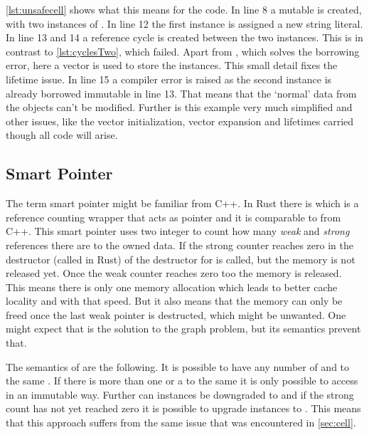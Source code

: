 \documentclass[thesis]{subfiles}
\begin{document}
    \autoref{lst:unsafecell} shows what this means for the code.
    In line 8 a mutable  is created, with two instances of \Node.
    In line 12 the first instance is assigned a new string literal.
    In line 13 and 14 a reference cycle is created between the two  instances.
    This is in contrast to \autoref{lst:cyclesTwo}, which failed.
    Apart from , which solves the borrowing error, here a vector is used to store the \Node instances.
    This small detail fixes the lifetime issue.
    In line 15 a compiler error is raised as the second \Node instance is already borrowed immutable in line 13.
    That means that the `normal' data from the objects can't be modified.
    Further is this example very much simplified and other issues, like the vector initialization, vector expansion and lifetimes carried though all code will arise.

    

  \subsection{Smart Pointer}
    The term smart pointer might be familiar from C++.
    In Rust there is \RcT which is a reference counting wrapper that acts as pointer and it is comparable to  from C++.
    This smart pointer uses two integer to count how many \emph{weak} and \emph{strong} references there are to the owned data.
    If the strong counter reaches zero in the destructor (called  in Rust) of \RcT the destructor for \T is called, but the memory is not released yet.
    Once the weak counter reaches zero too the memory is released.
    This means there is only one memory allocation which leads to better cache locality and with that speed.
    But it also means that the memory can only be freed once the last weak pointer is destructed, which might be unwanted.
    One might expect that \RcT is the solution to the graph problem, but its semantics prevent that.\autocite{rust-doc}

    The semantics of \RcT are the following.
    It is possible to have any number of \RcTs and \WeakTs to the same \T.
    If there is more than one \RcT or a \WeakT to the same \T it is only possible to access \T in an immutable way.
    Further can \RcT instances be downgraded to \WeakT and if the strong count has not yet reached zero it is possible to upgrade \WeakT instances to \RcT.
    This means that this approach suffers from the same issue that was encountered in \autoref{sec:cell}.\autocite{rust-doc}
\end{document}
